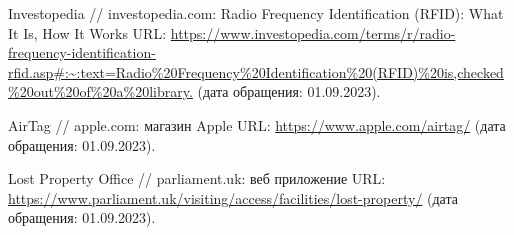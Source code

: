 \documentclass{mirea}
\begin{document}
\begin{thebibliography}{99\kern\bibindent}
	 Investopedia // investopedia.com: Radio Frequency Identification (RFID): What It Is, How It Works URL: \url{https://www.investopedia.com/terms/r/radio-frequency-identification-rfid.asp#:~:text=Radio%20Frequency%20Identification%20(RFID)%20is,checked%20out%20of%20a%20library.} (дата обращения: 01.09.2023).
	
	 AirTag // apple.com: магазин Apple URL: \url{https://www.apple.com/airtag/} (дата обращения: 01.09.2023).
	
	 Lost Property Office // parliament.uk: веб приложение URL: \url{https://www.parliament.uk/visiting/access/facilities/lost-property/} (дата обращения: 01.09.2023).
\end{thebibliography}




%

	
\end{document}
